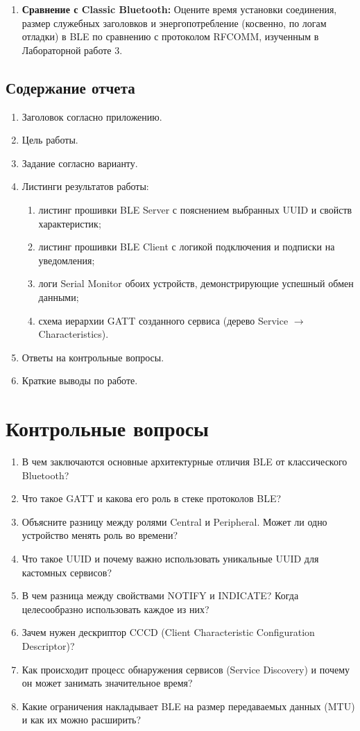 \begin{enumerate}[nosep, leftmargin=*]
    \item \textbf{Сравнение с Classic Bluetooth:}
    Оцените время установки соединения, размер служебных заголовков и энергопотребление (косвенно, по логам отладки) в BLE по сравнению с протоколом RFCOMM, изученным в Лабораторной работе 3.
\end{enumerate}


\subsection{Содержание отчета}
\begin{enumerate}[nosep, leftmargin=*]
    \item Заголовок согласно приложению.
    \item Цель работы.
    \item Задание согласно варианту.
    \item Листинги результатов работы:
    \begin{enumerate}[label=\alph*), nosep]
        \item листинг прошивки BLE Server с пояснением выбранных UUID и свойств характеристик;
        \item листинг прошивки BLE Client с логикой подключения и подписки на уведомления;
        \item логи Serial Monitor обоих устройств, демонстрирующие успешный обмен данными;
        \item схема иерархии GATT созданного сервиса (дерево Service $\rightarrow$ Characteristics).
    \end{enumerate}
    \item Ответы на контрольные вопросы.
    \item Краткие выводы по работе.
\end{enumerate}

\section*{Контрольные вопросы}
\begin{enumerate}[nosep, leftmargin=*]
    \item В чем заключаются основные архитектурные отличия BLE от классического Bluetooth?
    \item Что такое GATT и какова его роль в стеке протоколов BLE?
    \item Объясните разницу между ролями Central и Peripheral. Может ли одно устройство менять роль во времени?
    \item Что такое UUID и почему важно использовать уникальные UUID для кастомных сервисов?
    \item В чем разница между свойствами NOTIFY и INDICATE? Когда целесообразно использовать каждое из них?
    \item Зачем нужен дескриптор CCCD (Client Characteristic Configuration Descriptor)?
    \item Как происходит процесс обнаружения сервисов (Service Discovery) и почему он может занимать значительное время?
    \item Какие ограничения накладывает BLE на размер передаваемых данных (MTU) и как их можно расширить?
\end{enumerate}
